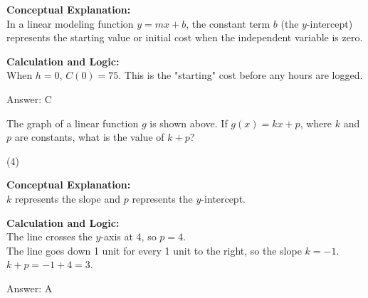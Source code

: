 \documentclass[11pt,paper=a4,answers]{exam}
\begin{document}
\begin{questions}
\begin{solution}
\textbf{Conceptual Explanation:} \\
In a linear modeling function $y = mx + b$, the constant term $b$ (the $y$-intercept) represents the starting value or initial cost when the independent variable is zero.

\vspace{10pt}
\textbf{Calculation and Logic:} \\
When $h = 0$, $C(0) = 75$. This is the "starting" cost before any hours are logged.

\vspace{15pt}
Answer: \colorbox{yellow!100}{C}
\end{solution}

\vspace{20pt}

\question

The graph of a linear function $g$ is shown above. If $g(x) = kx + p$, where $k$ and $p$ are constants, what is the value of $k + p$?
\begin{tasks}(4)
\end{tasks}
\begin{center}
\end{center}
\begin{solution}
\textbf{Conceptual Explanation:} \\
$k$ represents the slope and $p$ represents the $y$-intercept.

\vspace{10pt}
\textbf{Calculation and Logic:} \\
The line crosses the $y$-axis at 4, so $p = 4$. \\
The line goes down 1 unit for every 1 unit to the right, so the slope $k = -1$. \\
$k + p = -1 + 4 = 3$.

\vspace{15pt}
Answer: \colorbox{yellow!100}{A}
\end{solution}

\vspace{20pt}


\end{questions}
\end{document}
